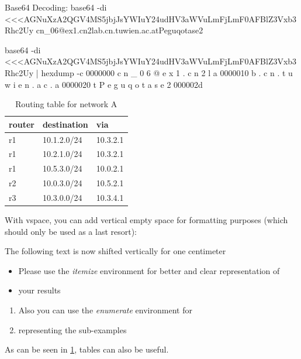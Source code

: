 \documentclass[parskip=full]{scrartcl}
\begin{document}
Base64 Decoding:
base64 -di <<<AGNuXzA2QGV4MS5jbjJsYWIuY24udHV3aWVuLmFjLmF0AFBlZ3Vxb3Rhc2Uy
cn_06@ex1.cn2lab.cn.tuwien.ac.atPeguqotase2

base64 -di <<<AGNuXzA2QGV4MS5jbjJsYWIuY24udHV3aWVuLmFjLmF0AFBlZ3Vxb3Rhc2Uy | hexdump -c
0000000  \0   c   n   _   0   6   @   e   x   1   .   c   n   2   l   a
0000010   b   .   c   n   .   t   u   w   i   e   n   .   a   c   .   a
0000020   t  \0   P   e   g   u   q   o   t   a   s   e   2            
000002d



\begin{table}[hb]
    \centering
    \caption{Routing table for network A}
    \label{tab:routing}
    \begin{tabular}{lll}
        \toprule
        \textbf{router} & \textbf{destination} & \textbf{via}  \\ \midrule
        r1 & 10.1.2.0/24 & 10.3.2.1 \\
        r1 & 10.2.1.0/24 & 10.3.2.1 \\
        r1 & 10.5.3.0/24 & 10.0.2.1 \\
        \midrule
        r2 & 10.0.3.0/24 & 10.5.2.1 \\
        \midrule
        r3 & 10.3.0.0/24 & 10.3.4.1 \\
        \bottomrule
    \end{tabular}
\end{table}
With vspace, you can add vertical empty space for formatting purposes (which should only be used as a last resort):
\vspace*{1cm}

The following text is now shifted vertically for one centimeter

\begin{itemize}
\item Please use the \textit{itemize} environment for better and clear representation of
\item your results
\end{itemize}

\begin{enumerate}
\item Also you can use the \textit{enumerate} environment for 
\item representing the sub-examples
\end{enumerate}

As can be seen in \cref{tab:routing}, tables can also be useful.
\end{document}
